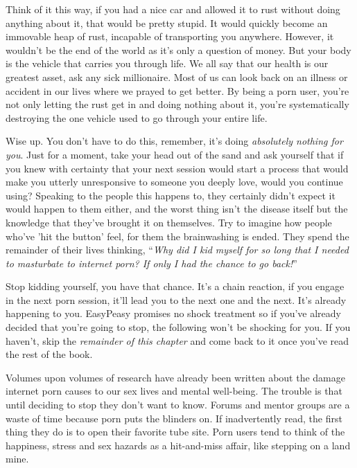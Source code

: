 \documentclass[
]{book}
\begin{document}
Think of it this way, if you had a nice car and allowed it to rust without doing anything about it, that would be pretty stupid. It would quickly become an immovable heap of rust, incapable of transporting you anywhere. However, it wouldn't be the end of the world as it's only a question of money. But your body is the vehicle that carries you through life. We all say that our health is our greatest asset, ask any sick millionaire. Most of us can look back on an illness or accident in our lives where we prayed to get better. By being a porn user, you're not only letting the rust get in and doing nothing about it, you're systematically destroying the one vehicle used to go through your entire life.

Wise up. You don't have to do this, remember, it's doing \emph{absolutely nothing for you}. Just for a moment, take your head out of the sand and ask yourself that if you knew with certainty that your next session would start a process that would make you utterly unresponsive to someone you deeply love, would you continue using? Speaking to the people this happens to, they certainly didn't expect it would happen to them either, and the worst thing isn't the disease itself but the knowledge that they've brought it on themselves. Try to imagine how people who've 'hit the button' feel, for them the brainwashing is ended. They spend the remainder of their lives thinking, ``\emph{Why did I kid myself for so long that I needed to masturbate to internet porn? If only I had the chance to go back!}''

Stop kidding yourself, you have that chance. It's a chain reaction, if you engage in the next porn session, it'll lead you to the next one and the next. It's already happening to you. EasyPeasy promises no shock treatment so if you've already decided that you're going to stop, the following won't be shocking for you. If you haven't, skip the \emph{remainder of this chapter} and come back to it once you've read the rest of the book.

Volumes upon volumes of research have already been written about the damage internet porn causes to our sex lives and mental well-being. The trouble is that until deciding to stop they don't want to know. Forums and mentor groups are a waste of time because porn puts the blinders on. If inadvertently read, the first thing they do is to open their favorite tube site. Porn users tend to think of the happiness, stress and sex hazards as a hit-and-miss affair, like stepping on a land mine.
\end{document}
